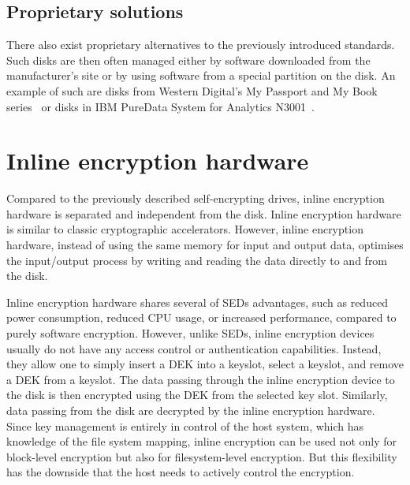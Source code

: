 \subsection{Proprietary solutions}

There also exist proprietary alternatives to the previously introduced standards. Such disks are then often managed either by software downloaded from the manufacturer's site or by using software from a special partition on the disk.
An example of such are disks from Western Digital's My Passport and My Book series~\cite{got_hw_crypto} or disks in IBM PureData System for Analytics N3001~\cite{ibm_sed}.





\section{Inline encryption hardware}

Compared to the previously described self-encrypting drives, inline encryption hardware is separated and independent from the disk. Inline encryption hardware is similar to classic cryptographic accelerators. However, inline encryption hardware, instead of using the same memory for input and output data, optimises the input/output process by writing and reading the data directly to and from the disk.

Inline encryption hardware shares several of SEDs advantages, such as reduced power consumption, reduced CPU usage, or increased performance, compared to purely software encryption.
However, unlike SEDs, inline encryption devices usually do not have any access control or authentication capabilities. Instead, they allow one to simply insert a DEK into a keyslot, select a keyslot, and remove a DEK from a keyslot. The data passing through the inline encryption device to the disk is then encrypted using the DEK from the selected key slot. Similarly, data passing from the disk are decrypted by the inline encryption hardware.
Since key management is entirely in control of the host system, which has knowledge of the file system mapping, inline encryption can be used not only for block-level encryption but also for filesystem-level encryption. But this flexibility has the downside that the host needs to actively control the encryption.

